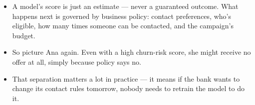 \documentclass[11pt,a4paper]{article}
\begin{document}
\begin{examplebox}[title after break={SPOKEN SCRIPT --- slide 7 continued}]
\begin{itemize}
\item A model's score is just an estimate — never a guaranteed outcome. What happens next is governed by business policy: contact preferences, who's eligible, how many times someone can be contacted, and the campaign's budget.
\item So picture Ana again. Even with a high churn-risk score, she might receive no offer at all, simply because policy says no.
\item That separation matters a lot in practice — it means if the bank wants to change its contact rules tomorrow, nobody needs to retrain the model to do it.
\end{itemize}
\end{examplebox}
\par\noindent{\scriptsize\textcolor{teal!60!black}{Reading anchor: Bass, Ch. 14 · Teaching policy decomposition}}
\clearpage
\end{document}
